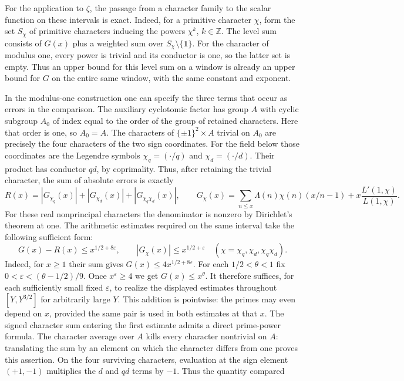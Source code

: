 \documentclass[11pt]{amsart}
\theoremstyle{definition}
\theoremstyle{remark}
\begin{document}
For the application to $\zeta$, the passage from a character family
to the scalar function on these intervals is exact. Indeed, for a
primitive character $\chi$, form the set $S_\chi$ of primitive
characters inducing the powers $\chi^k$, $k\in\mathbb Z$. The level
sum consists of $G(x)$ plus a weighted sum over
$S_\chi\setminus\{\mathbf 1\}$. For the character of modulus one,
every power is trivial and its conductor is one, so the latter set is
empty. Thus an upper bound for this level sum on a window is already
an upper bound for $G$ on the entire same window, with the same
constant and exponent.

In the modulus-one construction one can specify the three terms that
occur as errors in the comparison. The auxiliary cyclotomic factor
has group $A$ with cyclic subgroup $A_0$ of index equal to the order
of the group of retained characters. Here that order is one, so
$A_0=A$. The characters of $\{\pm1\}^2\times A$ trivial on $A_0$
are precisely the four characters of the two sign coordinates. For
the field below those coordinates are the Legendre symbols
$\chi_q=(\cdot/q)$ and $\chi_d=(\cdot/d)$. Their product has
conductor $qd$, by coprimality. Thus, after retaining the trivial
character, the sum of absolute errors is exactly
\[
 R(x)=|G_{\chi_q}(x)|+|G_{\chi_d}(x)|+|G_{\chi_q\chi_d}(x)|,
 \qquad
 G_\chi(x)=\sum_{n\le x}\Lambda(n)\chi(n)(x/n-1)
             +x\frac{L'(1,\chi)}{L(1,\chi)} .
\]
For these real nonprincipal characters the denominator is nonzero
by Dirichlet's theorem at one. The arithmetic estimates required
on the same interval take the following sufficient form:
\[
 G(x)-R(x)\le x^{1/2+8\varepsilon},\qquad
 |G_\chi(x)|\le x^{1/2+\varepsilon}
 \quad(\chi=\chi_q,\chi_d,\chi_q\chi_d).
\]
Indeed, for $x\ge1$ their sum gives $G(x)\le4x^{1/2+8\varepsilon}$.
For each $1/2<\theta<1$ fix $0<\varepsilon<(\theta-1/2)/9$.
Once $x^\varepsilon\ge4$ we get $G(x)\le x^\theta$. It therefore
suffices, for each sufficiently small fixed $\varepsilon$, to realize
the displayed estimates throughout $[Y,Y^{3/2}]$ for arbitrarily
large $Y$. This addition is pointwise: the primes may even depend on
$x$, provided the same pair is used in both estimates at that $x$.
The signed character sum entering the first estimate admits a direct
prime-power formula. The character average over $A$ kills every
character nontrivial on $A$: translating the sum by an element on
which the character differs from one proves this assertion. On the
four surviving characters, evaluation at the sign element $(+1,-1)$
multiplies the $d$ and $qd$ terms by $-1$. Thus the quantity compared
\end{document}
